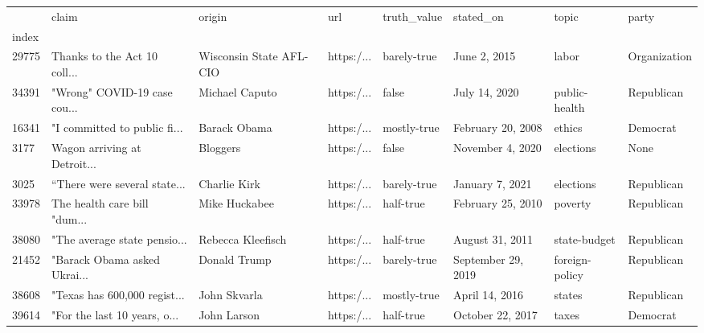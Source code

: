 \begin{tabular}{llllllll}
\toprule
{} &                         claim &                   origin &         url &  truth\_value &           stated\_on &           topic &         party \\
index &                               &                          &             &              &                     &                 &               \\
\midrule
29775 &  Thanks to the Act 10 coll... &  Wisconsin State AFL-CIO &  https:/... &  barely-true &        June 2, 2015 &           labor &  Organization \\
34391 &  "Wrong" COVID-19 case cou... &           Michael Caputo &  https:/... &        false &       July 14, 2020 &   public-health &    Republican \\
16341 &  "I committed to public fi... &             Barack Obama &  https:/... &  mostly-true &   February 20, 2008 &          ethics &      Democrat \\
3177  &  Wagon arriving at Detroit... &                 Bloggers &  https:/... &        false &    November 4, 2020 &       elections &          None \\
3025  &  “There were several state... &             Charlie Kirk &  https:/... &  barely-true &     January 7, 2021 &       elections &    Republican \\
33978 &  The health care bill "dum... &            Mike Huckabee &  https:/... &    half-true &   February 25, 2010 &         poverty &    Republican \\
38080 &  "The average state pensio... &        Rebecca Kleefisch &  https:/... &    half-true &     August 31, 2011 &    state-budget &    Republican \\
21452 &  "Barack Obama asked Ukrai... &             Donald Trump &  https:/... &  barely-true &  September 29, 2019 &  foreign-policy &    Republican \\
38608 &  "Texas has 600,000 regist... &             John Skvarla &  https:/... &  mostly-true &      April 14, 2016 &          states &    Republican \\
39614 &  "For the last 10 years, o... &              John Larson &  https:/... &    half-true &    October 22, 2017 &           taxes &      Democrat \\
\bottomrule
\end{tabular}
